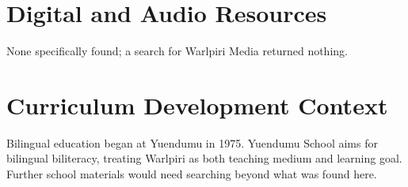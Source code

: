 \documentclass[12pt]{article}
\begin{document}
\section{Digital and Audio Resources}
None specifically found; a search for Warlpiri Media returned nothing.
\section{Curriculum Development Context}
Bilingual education began at Yuendumu in 1975. Yuendumu School aims for bilingual biliteracy, treating Warlpiri as both teaching medium and learning goal. Further school materials would need searching beyond what was found here.
\end{document}
